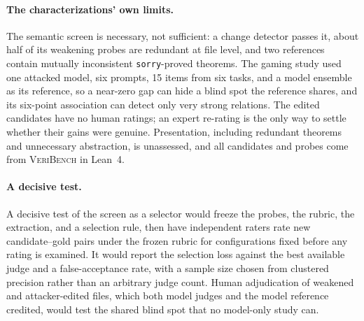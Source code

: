 \paragraph{The characterizations' own limits.}
The semantic screen is necessary, not sufficient: a change detector passes it, about half of its weakening probes are redundant at file level, and two references contain mutually inconsistent \texttt{sorry}-proved theorems.
The gaming study used one attacked model, six prompts, 15 items from six tasks, and a model ensemble as its reference, so a near-zero gap can hide a blind spot the reference shares, and its six-point association can detect only very strong relations.
The edited candidates have no human ratings; an expert re-rating is the only way to settle whether their gains were genuine.
Presentation, including redundant theorems and unnecessary abstraction, is unassessed, and all candidates and probes come from \textsc{VeriBench} in Lean~4.

\paragraph{A decisive test.}
A decisive test of the screen as a selector would freeze the probes, the rubric, the extraction, and a selection rule, then have independent raters rate new candidate--gold pairs under the frozen rubric for configurations fixed before any rating is examined.
It would report the selection loss against the best available judge and a false-acceptance rate, with a sample size chosen from clustered precision rather than an arbitrary judge count.
Human adjudication of weakened and attacker-edited files, which both model judges and the model reference credited, would test the shared blind spot that no model-only study can.
